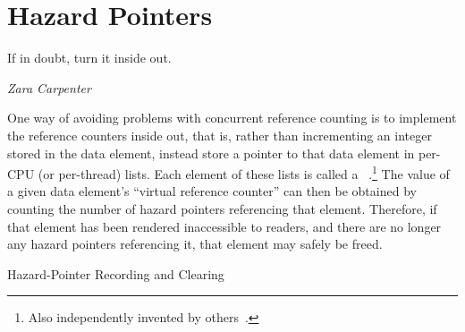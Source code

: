 
\section{Hazard Pointers}
\label{sec:defer:Hazard Pointers}
%
\epigraph{If in doubt, turn it inside out.}{\emph{Zara Carpenter}}

One way of avoiding problems with concurrent reference counting
is to implement the reference counters
inside out, that is, rather than incrementing an integer stored in the
data element, instead store a pointer to that data element in
per-CPU (or per-thread) lists.
Each element of these lists is called a
\emph{}~\cite{MagedMichael04a}.\footnote{
	Also independently invented by others~\cite{HerlihyLM02}.}
The value of a given data element's ``virtual reference counter'' can
then be obtained by counting the number of hazard pointers referencing
that element.
Therefore, if that element has been rendered inaccessible to readers,
and there are no longer any hazard pointers referencing it, that element
may safely be freed.

\begin{listing}

\caption{Hazard-Pointer Recording and Clearing}
\label{lst:defer:Hazard-Pointer Recording and Clearing}
\end{listing}


